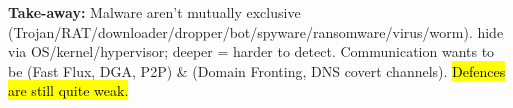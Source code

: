 \begin{defbox}
\textbf{Take-away:} Malware  aren't mutually exclusive (Trojan/RAT/downloader/dropper/bot/spyware/ransomware/virus/worm).  hide via OS/kernel/hypervisor; deeper = harder to detect. Communication wants to be  (Fast Flux, DGA, P2P) \&  (Domain Fronting, DNS covert channels). \hl{Defences are still quite weak.}
\end{defbox}

